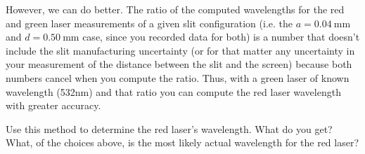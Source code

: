 However, we can do better. The ratio of the computed wavelengths for the red and green laser measurements of a given slit configuration (i.e. the $a = 0.04\:$mm and $d = 0.50\:$mm case, since you
recorded data for both) is a number that doesn't include the slit manufacturing uncertainty (or for that matter any
uncertainty in your measurement of the distance between the slit and the screen) because both numbers cancel
when you compute the ratio. Thus, with a green laser of known wavelength (532nm) and that ratio you can compute
the red laser wavelength with greater accuracy.

Use this method to determine the red laser's wavelength. What do you get? What, of the choices above, is the most likely actual wavelength for the red laser?